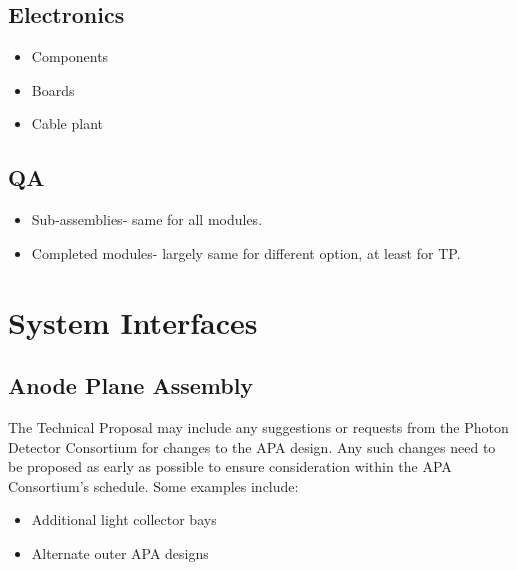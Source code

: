 \subsection{Electronics}
\label{sec:fdsp-pd-assy-pde}


\begin{itemize}
\item Components
\item Boards
\item Cable plant
\end{itemize}

\subsection{QA}
\label{sec:fdsp-pd-assy-qa}

\begin{itemize}
\item Sub-assemblies- same for all modules.
\item Completed modules- largely same for different option, at least for TP.
\end{itemize}


\section{System Interfaces}
\label{sec:fdsp-pd-intfc}



\subsection{Anode Plane Assembly}
\label{sec:fdsp-pd-intfc-apa}

The Technical Proposal may include any suggestions or requests from the Photon Detector Consortium
for changes to the APA design. Any such changes need to be proposed as early as possible to ensure
consideration within the APA Consortium's schedule. Some examples include:
\begin{itemize}
\item Additional light collector bays
\item Alternate outer APA designs
\end{itemize}

